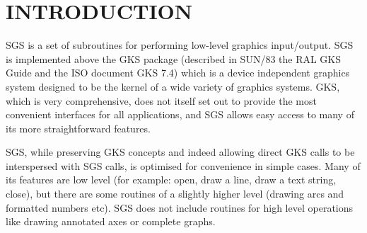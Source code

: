 \documentclass[11pt]{article}
\newcommand{\stardocinitials}  {SUN}
\newcommand{\stardocnumber}    {85.6}
\newcommand{\stardocname}{\stardocinitials /\stardocnumber}
\newcommand{\htmladdimg}[1]{}
\newenvironment{latexonly}{}{}
\newcommand{\htmlref}[2]{#1}
\newcommand{\htmladdtonavigation}[1]{}
\newcommand{\xref}[3]{#1}
\begin{document}
%

\section{INTRODUCTION}

SGS is a set of subroutines for performing low-level graphics input/output.
SGS is implemented above the GKS package (described in \xref{SUN/83}{sun83}, 
the RAL GKS Guide
and the ISO document GKS 7.4) which is a device independent graphics system
designed to be the kernel of a wide variety of graphics systems.
GKS, which is very comprehensive, does not itself set out to provide the most
convenient interfaces for all applications, and SGS allows easy access to many
of its more straightforward features. 

SGS, while preserving GKS concepts and indeed allowing direct GKS calls to be
interspersed with SGS calls, is optimised for convenience in simple cases.
Many of its features are low level (for example: open, draw a line, draw a text
string, close), but there are some routines of a slightly higher level (drawing
arcs and formatted numbers etc). 
SGS does not include routines for high level operations like drawing annotated
axes or complete graphs.
\end{document}
